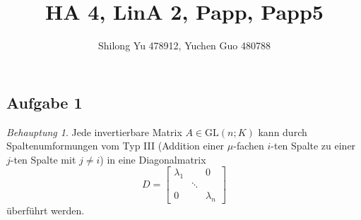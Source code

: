 \documentclass[fleqn,draft,a5paper,12pt]{article}
\title{HA 4, LinA 2, Papp, Papp5}
\author{Shilong Yu 478912, Yuchen Guo 480788}
\theoremstyle{remark}
\newtheorem*{Behauptung}{Behauptung}
\begin{document}
\maketitle


\subsection{Aufgabe 1}

\begin{Behauptung}
  Jede invertierbare Matrix \(A \in \mathrm{GL}(n; K)\) kann durch
  Spaltenumformungen vom Typ III (Addition einer \(\mu\)-fachen \(i\)-ten
  Spalte zu einer \(j\)-ten Spalte mit \(j \ne i\)) in eine Diagonalmatrix
  \[
    D =
    \begin{bmatrix}
      \lambda_{1} & & 0 \\
            &  \ddots & \\
      0 & & \lambda_{n}
    \end{bmatrix}
  \]
  überführt werden.
\end{Behauptung}
\end{document}
